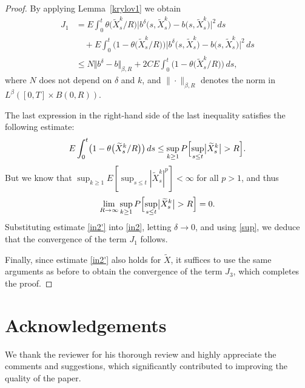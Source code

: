\documentclass[numbers,compress,v1.0.1]{vmsta}
\theoremstyle{definition}
\def\Sup{\displaystyle\sup}
\def\Lim{\displaystyle\lim}
\newcommand{\rrVert}{\Vert}
\newcommand{\llVert}{\Vert}
\begin{document}
\begin{proof}
By applying Lemma~\ref{krylov1} we obtain
%
\begin{align}
\label{in2} J_1 &= E\int_{0}^{t}\theta\bigl(\widetilde{X}^{k}_{s}/R\bigr) \bigl| b^{\delta}\bigl(s,\widetilde {X}^{k}_{s}\bigr) - b\bigl(s,\widetilde{X}^{k}_{s}\bigr) \bigr|^2 \,ds\nonumber\\
&\quad + E\int_{0}^{t} \bigl(1 - \theta\bigl(\widetilde{X}^{k}_{s}/R\bigr) \bigr) \bigl|b^{\delta}\bigl(s,\widetilde{X}^{k}_{s}\bigr)-b\bigl(s,\widetilde{X}^{k}_{s}\bigr) \bigr|^2 \,ds\nonumber\\
&\leq N \bigl\llVert b^{\delta}- b \bigr\rrVert _{\beta,R}+2CE\int_{0}^{t} \bigl(1-\theta\bigl(\widetilde{X}^{k}_{s}/R\bigr) \bigr)\,ds,
\end{align}
%
where $N$ does not depend on $\delta$ and $k$, and $\|\cdot\|_{\beta
,R}$ denotes the norm in
$L^{\beta}([0,T]\times B(0,R))$.

The last expression in the right-hand side of the last inequality
satisfies the following estimate:
%
\begin{equation}
\label{in2'} E\int_{0}^{t} \bigl(1 - \theta\bigl(\widetilde{X}^{k}_{s}/R\bigr) \bigr)\,ds \leq
\Sup_{k\geq1} P \Bigl[\Sup_{s\leq t}\bigl|\widetilde{X}^{k}_{s}\bigr|>R\Bigr].
\end{equation}
%
But we know that $\sup_{k\geq1} E [\sup_{s\leq t}|\widetilde
{X}^{k}_{s}|^{p} ] < \infty$ for all $p>1$, and thus
%
\begin{equation}
\label{sup} \Lim_{R \rightarrow\infty}\Sup_{k\geq1} P
\Bigl[\Sup_{s\leq t}\bigl|\widetilde{X}^{k}_{s}\bigr|>R \Bigr] = 0.
\end{equation}
%
Substituting estimate \eqref{in2'} into \eqref{in2}, letting $\delta
\rightarrow0$, and using \eqref{sup}, we deduce that the convergence
of the term $J_1$ follows.

Finally, since estimate \eqref{in2'} also holds for $\widetilde X$, it
suffices to use the same arguments as before to obtain the convergence
of the term $J_3$, which completes the proof.
\end{proof}
%
\section*{Acknowledgements} We thank the reviewer for his thorough
review and highly appreciate the comments and
suggestions, which significantly contributed to improving the quality
of the paper.
\end{document}
